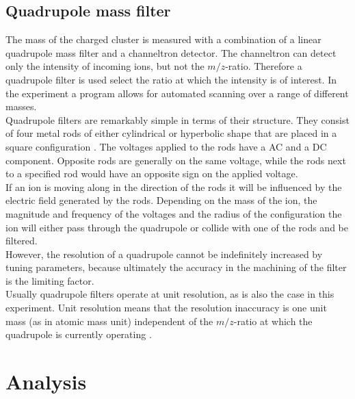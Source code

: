 \documentclass[a4paper,10pt]{article}
\begin{document}
\subsection{Quadrupole mass filter}
The mass of the charged cluster is measured with a combination of a linear quadrupole mass filter and a channeltron detector. The channeltron can detect only the intensity of incoming ions, but not the $m/z$-ratio. Therefore a quadrupole filter is used select the ratio at which the intensity is of interest. In the experiment a program allows for automated scanning over a range of different masses. \\
Quadrupole filters are remarkably simple in terms of their structure. They consist of four metal rods of either cylindrical or hyperbolic shape that are placed in a square configuration \cite{ms_book}. The voltages applied to the rods have a AC and a DC component. Opposite rods are generally on the same voltage, while the rods next to a specified rod would have an opposite sign on the applied voltage. \\
If an ion is moving along in the direction of the rods it will be influenced by the electric field generated by the rods. Depending on the mass of the ion, the magnitude and frequency of the voltages and the radius of the configuration the ion will either pass through the quadrupole or collide with one of the rods and be filtered. \\
However, the resolution of a quadrupole cannot be indefinitely increased by tuning parameters, because ultimately the accuracy in the machining of the filter is the limiting factor. \\
Usually quadrupole filters operate at unit resolution, as is also the case in this experiment. Unit resolution means that the resolution inaccuracy is one unit mass (as in atomic mass unit) independent of the $m/z$-ratio at which the quadrupole is currently operating \cite{ms_book}.

\section{Analysis}
\end{document}
